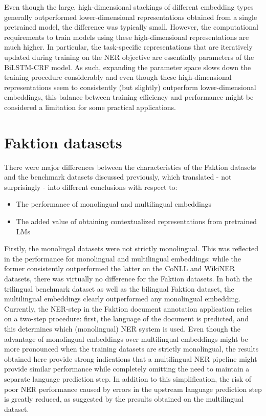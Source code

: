 \documentclass[12pt,a4paper,]{book}
\providecommand{\tightlist}{%
  \setlength{\itemsep}{0pt}\setlength{\parskip}{0pt}}
\begin{document}
Even though the large, high-dimensional stackings of different embedding types generally outperformed lower-dimensional representations obtained from a single pretrained model, the difference was typically small. However, the computational requirements to train models using these high-dimensional representations are much higher. In particular, the task-specific representations that are iteratively updated during training on the NER objective are essentially parameters of the BiLSTM-CRF model. As such, expanding the parameter space slows down the training procedure considerably and even though these high-dimensional representations seem to consistently (but slightly) outperform lower-dimensional embeddings, this balance between training efficiency and performance might be considered a limitation for some practical applications.

\hypertarget{faktion-datasets-2}{%
\section{Faktion datasets}\label{faktion-datasets-2}}

There were major differences between the characteristics of the Faktion datasets and the benchmark datasets discussed previously, which translated - not surprisingly - into different conclusions with respect to:

\begin{itemize}
\tightlist
\item
  The performance of monolingual and multilingual embeddings
\item
  The added value of obtaining contextualized representations from pretrained LMs
\end{itemize}

Firstly, the monolingal datasets were not strictly monolingual. This was reflected in the performance for monolingual and multilingual embeddings: while the former consistently outperformed the latter on the CoNLL and WikiNER datasets, there was virtually no difference for the Faktion datasets. In both the trilingual benchmark dataset as well as the bilingual Faktion dataset, the multilingual embeddings clearly outperformed any monolingual embedding. Currently, the NER-step in the Faktion document annotation application relies on a two-step procedure: first, the language of the document is predicted, and this determines which (monolingual) NER system is used. Even though the advantage of monolingual embeddings over multilingual embeddings might be more pronounced when the training datasets are strictly monolingual, the results obtained here provide strong indications that a multilingual NER pipeline might provide similar performance while completely omitting the need to maintain a separate language prediction step. In addition to this simplification, the risk of poor NER performance caused by errors in the upstream language prediction step is greatly reduced, as suggested by the presults obtained on the multilingual dataset.
\end{document}
